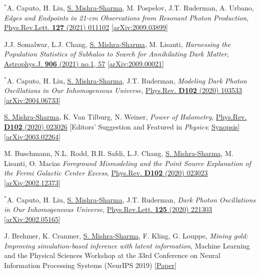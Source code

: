 \documentclass[letterpaper,11pt]{article}
\newenvironment{packed_enumerate}[1][]{
\begin{etaremune}[#1]
  \setlength{\itemsep}{3.7pt}
  \setlength{\parskip}{0pt}
  \setlength{\parsep}{0pt}}{\end{etaremune}
}
\begin{document}
\begin{packed_enumerate}[start=37]
  \item $^*$A. Caputo, H. Liu, \underline{S. Mishra-Sharma}, M. Pospelov, J.T. Ruderman, A. Urbano, \emph{Edges and Endpoints in 21-cm Observations from Resonant Photon Production},  \href{https://journals.aps.org/prl/abstract/10.1103/PhysRevLett.127.011102}{Phys.Rev.Lett. \textbf{127} (2021) 011102}   \href{https://arxiv.org/abs/2009.03899}{[arXiv:2009.03899]}

  \item J.J. Somalwar, L.J. Chang, \underline{S. Mishra-Sharma}, M. Lisanti, \emph{Harnessing the Population Statistics of Subhalos to Search for Annihilating Dark Matter}, \href{https://iopscience.iop.org/article/10.3847/1538-4357/abc87d}{Astrophys.J. \textbf{906} (2021) no.1, 57} \href{https://arxiv.org/abs/2009.00021}{[arXiv:2009.00021]}

  \item $^*$A. Caputo, H. Liu, \underline{S. Mishra-Sharma}, J.T. Ruderman, \emph{Modeling Dark Photon Oscillations in Our Inhomogeneous Universe}, \href{https://journals.aps.org/prd/abstract/10.1103/PhysRevD.102.103533}{Phys.Rev. \textbf{D102} (2020) 103533}   \href{https://arxiv.org/abs/2004.06733}{[arXiv:2004.06733]}

  \item \underline{S. Mishra-Sharma}, K. Van Tilburg, N. Weiner, \emph{Power of Halometry}, \href{https://journals.aps.org/prd/abstract/10.1103/PhysRevD.102.023026}{Phys.Rev. \textbf{D102} (2020) 023026} [Editors' Suggestion and Featured in \emph{Physics}; \href{https://physics.aps.org/articles/v13/s98}{Synopsis}]  \href{https://arxiv.org/abs/2003.02264}{[arXiv:2003.02264]}

  \item M. Buschmann, N.L. Rodd, B.R. Safdi, L.J. Chang, \underline{S. Mishra-Sharma}, M. Lisanti, O. Macias \emph{Foreground Mismodeling and the Point Source Explanation of the Fermi Galactic Center Excess},  \href{https://journals.aps.org/prd/abstract/10.1103/PhysRevD.102.023023}{Phys.Rev. \textbf{D102} (2020) 023023} \href{https://arxiv.org/abs/2002.12373}{[arXiv:2002.12373]} 

  \item $^*$A. Caputo, H. Liu, \underline{S. Mishra-Sharma}, J.T. Ruderman, \emph{Dark Photon Oscillations in Our Inhomogeneous Universe}, \href{https://journals.aps.org/prl/abstract/10.1103/PhysRevLett.125.221303}{Phys.Rev.Lett. \textbf{125} (2020) 221303}  \href{https://arxiv.org/abs/2002.05165}{[arXiv:2002.05165]}

  \item J. Brehmer, K. Cranmer, \underline{S. Mishra-Sharma}, F. Kling, G. Louppe, \emph{Mining gold: Improving simulation-based inference with latent information}, {Machine Learning and the Physical Sciences Workshop at the 33rd Conference on Neural Information Processing Systems (NeurIPS 2019)} \href{https://ml4physicalsciences.github.io/files/NeurIPS_ML4PS_2019_16.pdf}{[Paper]}


\end{packed_enumerate}
\end{document}
